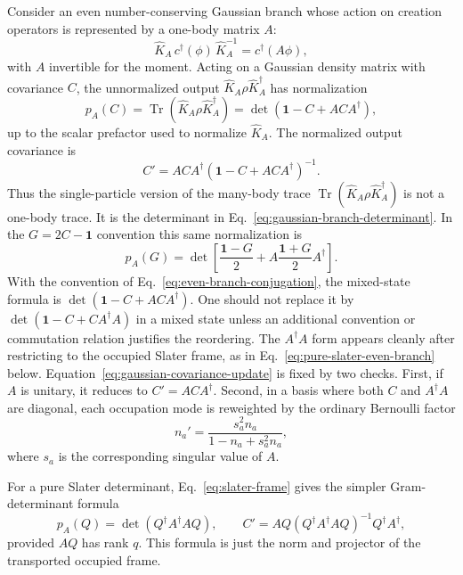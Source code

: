 \documentclass[aps,prb,onecolumn,nofootinbib,superscriptaddress]{revtex4-2}
\newcommand{\I}{\mathbf{1}}
\newcommand{\Tr}{\operatorname{Tr}}
\theoremstyle{plain}
\theoremstyle{definition}
\begin{document}
Consider an even number-conserving Gaussian branch whose action on creation
operators is represented by a one-body matrix \(A\):
\begin{equation}
  \hat K_A\,c^\dagger(\phi)\,\hat K_A^{-1}
  =
  c^\dagger(A\phi),
  \label{eq:even-branch-conjugation}
\end{equation}
with \(A\) invertible for the moment.  Acting on a Gaussian density matrix
with covariance \(C\), the unnormalized output \(\hat K_A\rho\hat K_A^\dagger\)
has normalization
\begin{equation}
  p_A(C)
  =
  \Tr(\hat K_A\rho\hat K_A^\dagger)
  =
  \det\!\left(\I-C+ACA^\dagger\right),
  \label{eq:gaussian-branch-determinant}
\end{equation}
up to the scalar prefactor used to normalize \(\hat K_A\).  The normalized
output covariance is
\begin{equation}
  C'
  =
  ACA^\dagger
  \left(\I-C+ACA^\dagger\right)^{-1}.
  \label{eq:gaussian-covariance-update}
\end{equation}
Thus the single-particle version of the many-body trace
\(\Tr(\hat K_A\rho\hat K_A^\dagger)\) is not a one-body trace.  It is the
determinant in Eq.~\eqref{eq:gaussian-branch-determinant}.  In the
\(G=2C-\I\) convention this same normalization is
\begin{equation}
  p_A(G)
  =
  \det\!\left[
    \frac{\I-G}{2}
    +
    A\frac{\I+G}{2}A^\dagger
  \right].
  \label{eq:gaussian-branch-determinant-G}
\end{equation}
With the convention of Eq.~\eqref{eq:even-branch-conjugation}, the mixed-state
formula is \(\det(\I-C+ACA^\dagger)\).  One should not replace it by
\(\det(\I-C+C A^\dagger A)\) in a mixed state unless an additional convention
or commutation relation justifies the reordering.  The \(A^\dagger A\) form
appears cleanly after restricting to the occupied Slater frame, as in
Eq.~\eqref{eq:pure-slater-even-branch} below.
Equation~\eqref{eq:gaussian-covariance-update} is fixed by two checks.  First,
if \(A\) is unitary, it reduces to \(C'=ACA^\dagger\).  Second, in a basis
where both \(C\) and \(A^\dagger A\) are diagonal, each occupation mode is
reweighted by the ordinary Bernoulli factor
\begin{equation}
  n_a'=\frac{s_a^2 n_a}{1-n_a+s_a^2 n_a},
  \label{eq:bernoulli-reweighting}
\end{equation}
where \(s_a\) is the corresponding singular value of \(A\).

For a pure Slater determinant, Eq.~\eqref{eq:slater-frame} gives the simpler
Gram-determinant formula
\begin{equation}
  p_A(Q)=\det\!\left(Q^\dagger A^\dagger A Q\right),
  \qquad
  C'=
  A Q\left(Q^\dagger A^\dagger A Q\right)^{-1}Q^\dagger A^\dagger ,
  \label{eq:pure-slater-even-branch}
\end{equation}
provided \(AQ\) has rank \(q\).  This formula is just the norm and projector
of the transported occupied frame.
\end{document}
